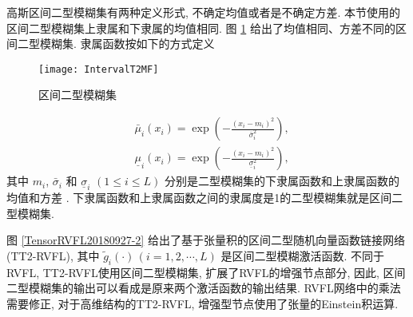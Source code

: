{高斯区间二型模糊集有两种定义形式,  不确定均值或者是不确定方差. 本节使用的区间二型模糊集上隶属和下隶属的均值相同.  图 \ref{TFLN:fig1-2}  给出了均值相同、方差不同的区间二型模糊集. 隶属函数按如下的方式定义
\begin{figure} [!htp]
\begin{center}
\texttt{[image: IntervalT2MF]}
\end{center}
\caption{区间二型模糊集}
\label{TFLN:fig1-2}
\end{figure}
\begin{align}
  &\bar{\mu} _{i} (x_i)=\exp\left(- \frac{(x_i-m_{i} )^2} {\bar{\sigma} ^2_{i} }  \right),\label{IT2TSKNM_mu1} \\
  &\underline{\mu} _{i} (x_i)=\exp\left(- \frac{(x_i-m_{i} )^2} {\underline{\sigma} ^2_{i} }  \right),\label{IT2TSKNM_mu2}
\end{align}
其中 $m_{i} $, $\bar{\sigma} _{i} $ 和 $\underline{\sigma} _{i} $ $(1\leq i\leq L)$ 分别是二型模糊集的下隶属函数和上隶属函数的均值和方差 . 下隶属函数和上隶属函数之间的隶属度是1的二型模糊集就是区间二型模糊集.

图 \ref{TensorRVFL20180927-2} 给出了基于张量积的区间二型随机向量函数链接网络 (TT2-RVFL), 其中 $\tilde g_i(\cdot)\, (i=1,2,\cdots,L)$ 是区间二型模糊激活函数. 不同于RVFL, TT2-RVFL使用区间二型模糊集, 扩展了RVFL的增强节点部分,
因此, 区间二型模糊集的输出可以看成是原来两个激活函数的输出结果. RVFL网络中的乘法需要修正, 对于高维结构的TT2-RVFL, 增强型节点使用了张量的Einstein积运算.
\begin{figure} [!htbp]
\def\circlrad2{0.1}
\begin{center}
\end{center}
\end{figure}}
